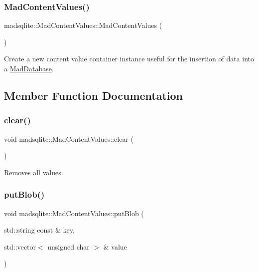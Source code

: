 \subsubsection{\texorpdfstring{Mad\+Content\+Values()}{MadContentValues()}}
{\footnotesize\ttfamily madsqlite\+::\+Mad\+Content\+Values\+::\+Mad\+Content\+Values (\begin{DoxyParamCaption}{ }\end{DoxyParamCaption})}

Create a new content value container instance useful for the insertion of data into a \hyperlink{classmadsqlite_1_1_mad_database}{Mad\+Database}. 

\subsection{Member Function Documentation}
\hypertarget{classmadsqlite_1_1_mad_content_values_a2415e71ac9c77ca280f9bb8feb433d54}{}\label{classmadsqlite_1_1_mad_content_values_a2415e71ac9c77ca280f9bb8feb433d54} 
\subsubsection{\texorpdfstring{clear()}{clear()}}
{\footnotesize\ttfamily void madsqlite\+::\+Mad\+Content\+Values\+::clear (\begin{DoxyParamCaption}{ }\end{DoxyParamCaption})}

Removes all values. \hypertarget{classmadsqlite_1_1_mad_content_values_aa4e03f42e0334133f243b2574f39a826}{}\label{classmadsqlite_1_1_mad_content_values_aa4e03f42e0334133f243b2574f39a826} 
\subsubsection{\texorpdfstring{put\+Blob()}{putBlob()}\hspace{0.1cm}{\footnotesize\ttfamily [1/2]}}
{\footnotesize\ttfamily void madsqlite\+::\+Mad\+Content\+Values\+::put\+Blob (\begin{DoxyParamCaption}\item[{std\+::string const \&}]{key,  }\item[{std\+::vector$<$ unsigned char $>$ \&}]{value }\end{DoxyParamCaption})}

